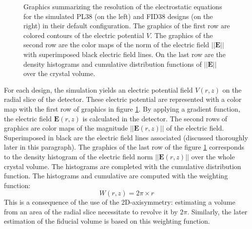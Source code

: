 \begin{figure}
\begin{minipage}{0.49\textwidth}
\end{minipage}
\caption{
Graphics summarizing the resolution of the electrostatic equations for the  simulated PL38 (on the left) and FID38 designs (on the right) in their default configuration. The graphics of the first row are colored contours of the electric potential $V$. The graphics of the second row are the color maps of the norm of the  electric field $|| \bm{E} ||$  with superimposed black electric field lines. On the last row are the density histograms and cumulative distribution functions of $|| \bm{E} ||$ over the crystal volume.
}
\label{fig:pl38-fid38-steady-state}
\end{figure}

For each design, the simulation yields an electric potential field $V(r,z)$ on the radial slice of the detector. These electric potential are represented with a color map with the first row of graphics in figure \ref{fig:pl38-fid38-steady-state}. 
By applying a gradient function, the electric field $\bm{E}(r,z)$ is calculated in the detector. The second rows of graphics are color maps of the magnitude $||\bm{E}(r,z)||$ of the electric field. Superimposed in black are the electric field lines associated (discussed thoroughly later in this paragraph).
The graphics of the last row of the figure \ref{fig:pl38-fid38-steady-state} corresponds to the density histogram of the electric field norm $||\bm{E}(r,z)||$ over the whole crystal volume. The histograms are completed with the cumulative distribution function. The histograms and cumulative are computed with the weighting function:
\begin{equation}
\label{eq:rotation-weight}
W(r,z) = 2\pi \times r
\end{equation}
This is a consequence of the use of the 2D-axisymmetry: estimating a volume from an area of the radial slice necessitate to revolve it by $2\pi$. Similarly, the later estimation of the fiducial volume is based on this weighting function.

